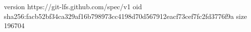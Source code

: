 version https://git-lfs.github.com/spec/v1
oid sha256:facb52bf34ca329af16b798973cc4198d70d567912eacf73cef7fc2fd3776f9a
size 196704
